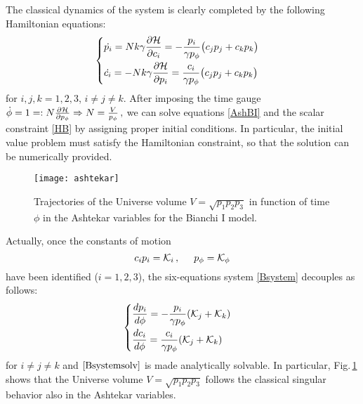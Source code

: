 \documentclass[aps,prd,twocolumn,nofootinbib,superscriptaddress]{revtex4-2}
\begin{document}
The classical dynamics of the system is clearly completed by the following Hamiltonian equations:
\begin{equation}
\begin{cases}
\begin{aligned}
	\label{AshBI}
	&	\dot{p_i}=Nk\gamma{{\partial \mathcal{H}}\over{\partial c_i}}=-{{p_i}\over\gamma p_{\phi}}\big(c_{j}p_{j}+c_{k}p_{k}\big)\\
	&\dot{c_i}=-Nk\gamma{{\partial \mathcal{H}}\over{\partial p_i}}={c_{i}\over{\gamma p_{\phi}}}\big(c_{j}p_{j}+c_{k}p_{k}\big)
\end{aligned}
\end{cases}
\end{equation}
for $i,j,k=1,2,3$, $i\neq j\neq k$. After imposing the time gauge $ \dot \phi=1=:N{{\partial\mathcal{H}}\over{\partial p_\phi}}\Rightarrow N={V\over p_\phi}\,,$ we can solve equations \eqref{AshBI} and the scalar constraint \eqref{HB} by assigning proper initial conditions. In particular, the initial value problem must satisfy the Hamiltonian constraint, so that the solution can be numerically provided.
\begin{figure}[h!]
	\centering
	\texttt{[image: ashtekar]}
	\caption{Trajectories of the Universe volume $V=\sqrt{p_{1}p_{2}p_{3}}$ in function of time $\phi$ in the Ashtekar variables for the Bianchi I model.}
	\label{ashtekar}
\end{figure}

Actually, once the constants of motion
\begin{equation}
	\label{eqn:integraliprimi}
	{c_{i}p_{i}}=\mathcal{K}_{i}\,,\hspace{0.5cm}p_{\phi}=\mathcal{K}_{\phi}
\end{equation}
have been identified ($i=1,2,3$), the six-equations system \eqref{Bsystem} decouples as follows:
\begin{equation}
	\begin{cases}
    \begin{aligned}
    \label{Bsystemsolv}
	&{{dp_i}\over{d\phi}}=-{{p_i}\over\gamma p_{\phi}}(\mathcal{K}_{j}+\mathcal{K}_{k})\\
	&{{dc_i}\over{d\phi}}={c_{i}\over{\gamma p_{\phi}}}(\mathcal{K}_{j}+\mathcal{K}_{k})
	\end{aligned}
\end{cases}
\end{equation}
for $i\neq j\neq k$ and $\eqref{Bsystemsolv}$ is made analytically solvable. In particular, Fig.$\,$\ref{ashtekar} shows that the Universe volume $V=\sqrt{p_{1}p_{2}p_{3}}$ follows the classical singular behavior also in the Ashtekar variables.
\end{document}
